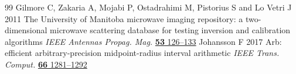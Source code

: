 \begin{thebibliography}{99}
 Gilmore C, Zakaria A, Mojabi P, Ostadrahimi M, Pistorius S and Lo Vetri J 2011 The University of Manitoba microwave imaging repository: a two-dimensional microwave scattering database for testing inversion and calibration algorithms \emph{IEEE Antennas Propag. Mag.} \href{https://doi.org/10.1109/MAP.2011.6138442}{\textbf{53} 126--133}
 Johansson F 2017 Arb: efficient arbitrary-precision midpoint-radius interval arithmetic \emph{IEEE Trans. Comput.} \href{https://doi.org/10.1109/TC.2017.2690633}{\textbf{66} 1281--1292}
\end{thebibliography}
